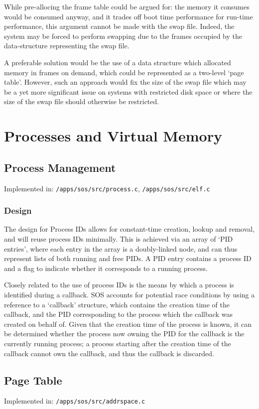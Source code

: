 \documentclass[a4paper,12pt]{article}
\begin{document}
While pre-allocing the frame table could be argued for: the memory it consumes
would be consumed anyway, and it trades off boot time performance for run-time
performance, this argument cannot be made with the swap file.  Indeed, the
system may be forced to perform swapping due to the frames occupied by the
data-structure representing the swap file.

A preferable solution would be the use of a data structure which allocated
memory in frames on demand, which could be represented as a two-level `page
table'.  However, such an approach would fix the size of the swap file which
may be a yet more significant issue on systems with restricted disk space or
where the size of the swap file should otherwise be restricted.

\section{Processes and Virtual Memory}
\subsection{Process Management}
Implemented in: \texttt{/apps/sos/src/process.c}, \texttt{/apps/sos/src/elf.c}

\subsubsection{Design}
The design for Process IDs allows for constant-time creation, lookup and
removal, and will reuse process IDs minimally.  This is achieved via an array
of `PID entries', where each entry in the array is a doubly-linked node, and
can thus represent lists of both running and free PIDs.  A PID entry contains
a process ID and a flag to indicate whether it corresponds to a running
process.

Closely related to the use of process IDs is the means by which a process is
identified during a callback.  SOS accounts for potential race conditions by
using a reference to a `callback' structure, which contains the creation time
of the callback, and the PID corresponding to the process which the callback
was created on behalf of.  Given that the creation time of the process is
known, it can be determined whether the process now owning the PID for the
callback is the currently running process; a process starting after the
creation time of the callback cannot own the callback, and thus the callback
is discarded.

\subsection{Page Table}
Implemented in: \texttt{/apps/sos/src/addrspace.c}
\end{document}
